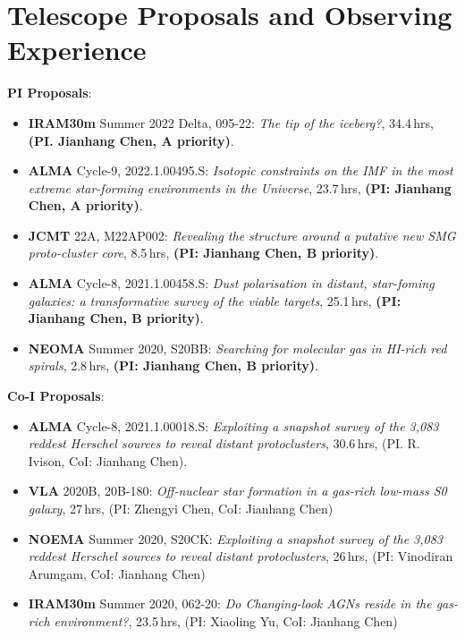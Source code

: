 \documentclass[A4,11pt]{article}
\newenvironment{paperlist}
{ \begin{itemize}[leftmargin=0.8cm, label={$\bullet$}]
    \setlength{\itemsep}{1pt}
    \setlength{\parskip}{1pt}
    \setlength{\parsep}{1pt}     }
{ \end{itemize}                  }
\begin{document}

\section{Telescope Proposals and Observing Experience}
{\bf PI Proposals}:\\
\vspace{-0.8em}
\begin{paperlist}
  \item {\bf IRAM30m} Summer 2022 Delta, 095-22: \emph{The tip of the iceberg?}, 34.4\,hrs, {\bf (PI. Jianhang Chen, A priority)}.
    \item {\bf ALMA} Cycle-9, 2022.1.00495.S: \emph{Isotopic constraints on the IMF in the most extreme star-forming environments in the Universe}, 23.7\,hrs, {\bf (PI: Jianhang Chen, A priority)}. 
    \item {\bf JCMT} 22A, M22AP002: \emph{Revealing the structure around a putative new SMG proto-cluster core}, 8.5\,hrs, {\bf (PI: Jianhang Chen, B priority)}.
    \item {\bf ALMA} Cycle-8, 2021.1.00458.S: \emph{Dust polarisation in distant, star-foming galaxies: a transformative survey of the viable targets}, 25.1\,hrs, {\bf (PI: Jianhang Chen, B priority)}. 
    \item {\bf NEOMA} Summer 2020, S20BB: \emph{Searching for molecular gas in HI-rich red spirals}, 2.8\,hrs, {\bf (PI: Jianhang Chen, B priority)}. 
\end{paperlist}

{\bf Co-I Proposals}:\\
\vspace{-0.8em}
\begin{paperlist}
    \item {\bf ALMA} Cycle-8, 2021.1.00018.S: \emph{Exploiting a snapshot survey of the 3,083 reddest Herschel sources to reveal distant protoclusters}, 30.6\,hrs, (PI. R. Ivison, CoI: Jianhang Chen).
    \item {\bf VLA} 2020B, 20B-180: \emph{Off-nuclear star formation in a gas-rich low-mass S0 galaxy}, 27\,hrs, (PI: Zhengyi Chen, CoI: Jianhang Chen)
    \item {\bf NOEMA} Summer 2020, S20CK: \emph{Exploiting a snapshot survey of the 3,083 reddest Herschel sources to reveal distant protoclusters}, 26\,hrs, (PI: Vinodiran Arumgam, CoI: Jianhang Chen)
    \item {\bf IRAM30m} Summer 2020, 062-20: \emph{Do Changing-look AGNs reside in the gas-rich environment?}, 23.5\,hrs, (PI: Xiaoling Yu, CoI: Jianhang Chen)
\end{paperlist}
\end{document}
